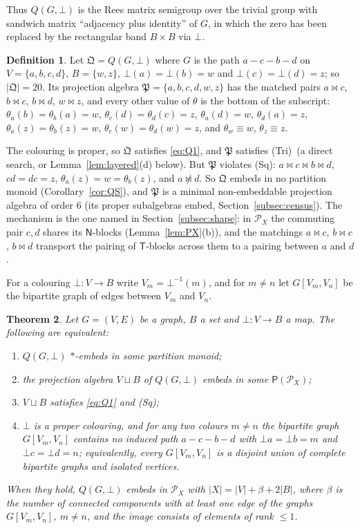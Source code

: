 \documentclass[11pt]{amsart}
\newtheorem{theorem}{Theorem}[section]
\theoremstyle{definition}
\newtheorem{definition}[theorem]{Definition}
\renewcommand{\P}{\mathcal{P}}      %
\newcommand{\PA}{\mathsf{P}}         %
\newcommand{\T}{\mathsf{T}}
\newcommand{\N}{\mathsf{N}}
\newcommand{\mt}{\bowtie}      %
\newcommand{\Tri}{\textup{(Tri)}}
\newcommand{\Wire}{\textup{(Sq)}}      %
\begin{document}
Thus $Q(G,\bot)$ is the Rees matrix semigroup over the trivial group with sandwich matrix ``adjacency plus identity'' of $G$, in which the zero has been replaced by the rectangular band $B\times B$ via $\bot$.

\begin{definition}\label{def:Qpath}
Let $\mathfrak Q=Q(G,\bot)$ where $G$ is the path $a-c-b-d$ on $V=\{a,b,c,d\}$, $B=\{w,z\}$, $\bot(a)=\bot(b)=w$ and $\bot(c)=\bot(d)=z$; so $|\mathfrak Q|=20$. Its projection algebra $\mathfrak P=\{a,b,c,d,w,z\}$ has the matched pairs $a\mt c$, $b\mt c$, $b\mt d$, $w\mt z$, and every other value of $\theta$ is the bottom of the subscript: $\theta_a(b)=\theta_b(a)=w$, $\theta_c(d)=\theta_d(c)=z$, $\theta_a(d)=w$, $\theta_d(a)=z$, $\theta_a(z)=\theta_b(z)=w$, $\theta_c(w)=\theta_d(w)=z$, and $\theta_w\equiv w$, $\theta_z\equiv z$.
\end{definition}

The colouring is proper, so $\mathfrak Q$ satisfies \eqref{eq:Q1}, and $\mathfrak P$ satisfies \Tri\ (a direct search, or Lemma~\ref{lem:layered}(d) below). But $\mathfrak P$ violates \Wire: $a\mt c\mt b\mt d$, $cd=dc=z$, $\theta_a(z)=w=\theta_b(z)$, and $a\not\mt d$. So $\mathfrak Q$ embeds in no partition monoid (Corollary~\ref{cor:QS}), and $\mathfrak P$ is a minimal non-embeddable projection algebra of order $6$ (its proper subalgebras embed, Section~\ref{subsec:census}). The mechanism is the one named in Section~\ref{subsec:shape}: in $\P_X$ the commuting pair $c,d$ shares its $\N$-blocks (Lemma~\ref{lem:PX}(b)), and the matchings $a\mt c$, $b\mt c$, $b\mt d$ transport the pairing of $\T$-blocks across them to a pairing between $a$ and $d$.

For a colouring $\bot\colon V\to B$ write $V_m=\bot^{-1}(m)$, and for $m\ne n$ let $G[V_m,V_n]$ be the bipartite graph of edges between $V_m$ and $V_n$.

\begin{theorem}\label{thm:graphsg}
Let $G=(V,E)$ be a graph, $B$ a set and $\bot\colon V\to B$ a map. The following are equivalent:
\begin{enumerate}[label=\textup{(\roman*)},nosep]
\item $Q(G,\bot)$ $*$-embeds in some partition monoid;
\item the projection algebra $V\sqcup B$ of $Q(G,\bot)$ embeds in some $\PA(\P_X)$;
\item $V\sqcup B$ satisfies \eqref{eq:Q1} and \Wire;
\item $\bot$ is a proper colouring, and for any two colours $m\ne n$ the bipartite graph $G[V_m,V_n]$ contains no induced path $a-c-b-d$ with $\bot a=\bot b=m$ and $\bot c=\bot d=n$; equivalently, every $G[V_m,V_n]$ is a disjoint union of complete bipartite graphs and isolated vertices.
\end{enumerate}
When they hold, $Q(G,\bot)$ embeds in $\P_X$ with $|X|=|V|+\beta+2|B|$, where $\beta$ is the number of connected components with at least one edge of the graphs $G[V_m,V_n]$, $m\ne n$, and the image consists of elements of rank $\le1$.
\end{theorem}
\end{document}
